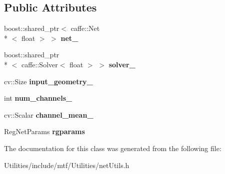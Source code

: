 \subsection*{Public Attributes}
\begin{DoxyCompactItemize}
\item 
\hypertarget{classutils_1_1MTFNet_a3b78d77bece125b59d3d6e147ae6a487}{boost\-::shared\-\_\-ptr$<$ caffe\-::\-Net\\*
$<$ float $>$ $>$ {\bfseries net\-\_\-}}\label{classutils_1_1MTFNet_a3b78d77bece125b59d3d6e147ae6a487}

\item 
\hypertarget{classutils_1_1MTFNet_a5f2ceab437687ae13d5f762ad803286e}{boost\-::shared\-\_\-ptr\\*
$<$ caffe\-::\-Solver$<$ float $>$ $>$ {\bfseries solver\-\_\-}}\label{classutils_1_1MTFNet_a5f2ceab437687ae13d5f762ad803286e}

\item 
\hypertarget{classutils_1_1MTFNet_a430553949f90e01b340b5fba3661e323}{cv\-::\-Size {\bfseries input\-\_\-geometry\-\_\-}}\label{classutils_1_1MTFNet_a430553949f90e01b340b5fba3661e323}

\item 
\hypertarget{classutils_1_1MTFNet_a4ec3d2b73c386bc4c4abc6387b5b7d41}{int {\bfseries num\-\_\-channels\-\_\-}}\label{classutils_1_1MTFNet_a4ec3d2b73c386bc4c4abc6387b5b7d41}

\item 
\hypertarget{classutils_1_1MTFNet_a4c10d3af8c47203efc47e7353bb76390}{cv\-::\-Scalar {\bfseries channel\-\_\-mean\-\_\-}}\label{classutils_1_1MTFNet_a4c10d3af8c47203efc47e7353bb76390}

\item 
\hypertarget{classutils_1_1MTFNet_a2e6763f6f4d738bafd7b4fdf1cb9b070}{Reg\-Net\-Params {\bfseries rgparams}}\label{classutils_1_1MTFNet_a2e6763f6f4d738bafd7b4fdf1cb9b070}

\end{DoxyCompactItemize}


The documentation for this class was generated from the following file\-:\begin{DoxyCompactItemize}
\item 
Utilities/include/mtf/\-Utilities/net\-Utils.\-h\end{DoxyCompactItemize}
